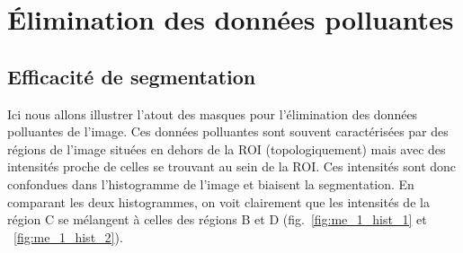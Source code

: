 	

		\section{Élimination des données polluantes}
		\label{sec:data_reduction}
			\subsection*{Efficacité de segmentation}
	Ici nous allons illustrer l'atout des masques pour l'élimination des données polluantes de l'image. Ces données polluantes sont souvent caractérisées par des régions de l'image situées en dehors de la ROI (topologiquement) mais avec des intensités proche de celles se trouvant au sein de la ROI. Ces intensités sont donc confondues dans l'histogramme de l'image et biaisent la segmentation. En comparant les deux histogrammes, on voit clairement que les intensités de la région C se mélangent à celles des régions B et D (fig.~\ref{fig:me_1_hist_1} et ~\ref{fig:me_1_hist_2}).

